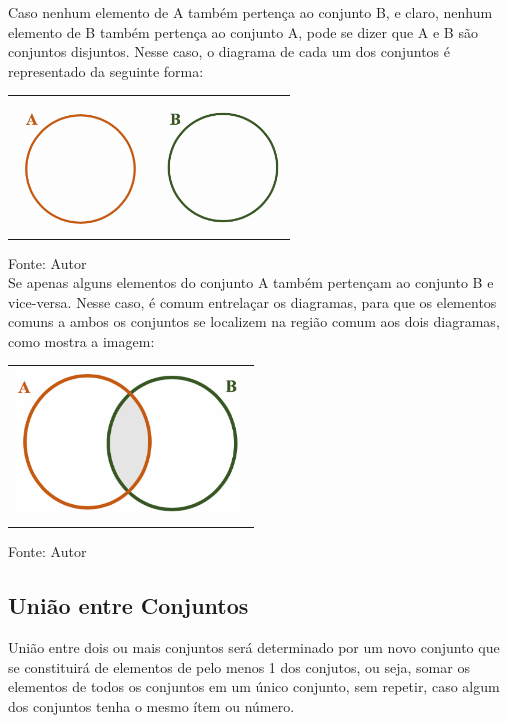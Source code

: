 \begin{multicols*}{2}
    Caso nenhum elemento de A também pertença ao conjunto B, e claro, nenhum elemento de B também pertença ao conjunto A, pode se dizer que A e B são conjuntos disjuntos. Nesse caso, o diagrama de cada um dos conjuntos é representado da seguinte forma:\\

    \begin{tabular}{@{}c@{}}
        \includegraphics[height=35mm]{assets/Conjunto Disjunto.png}
    \end{tabular}

    Fonte: Autor\\

    Se apenas alguns elementos do conjunto A também pertençam ao conjunto B e vice-versa. Nesse caso, é comum entrelaçar os diagramas, para que os elementos comuns a ambos os conjuntos se localizem na região comum aos dois diagramas, como mostra a imagem:\\

    \begin{tabular}{@{}c@{}}
        \includegraphics[height=40mm]{assets/Conjunto Intersecção.png}
    \end{tabular}

    Fonte: Autor\\

    \subsection{União entre Conjuntos}

    União entre dois ou mais conjuntos será determinado por um novo conjunto que se constituirá de elementos de pelo menos 1 dos conjutos, ou seja, somar os elementos de todos os conjuntos em um único conjunto, sem repetir, caso algum dos conjuntos tenha o mesmo ítem ou número.


\end{multicols*}
